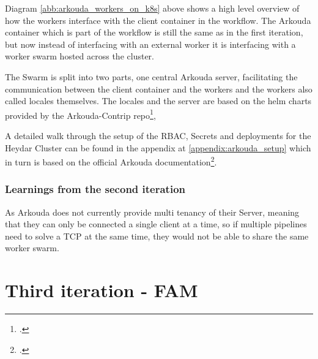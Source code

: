 Diagram \ref{abb:arkouda_workers_on_k8s} above shows a high level overview of how the workers interface with the client container in the workflow.
The Arkouda container which is part of the workflow is still the same as in the first iteration, but now instead of interfacing with an external worker it 
is interfacing with a worker swarm hosted across the cluster.

The Swarm is split into two parts, one central Arkouda server, facilitating the communication between the client container and the workers and the workers also called locales themselves.
The locales and the server are based on the helm charts provided by the Arkouda-Contrip repo\footcite{BearsRUsArkoudacontribArkoudahelmcharts},

A detailed walk through the setup of the \ac{RBAC}, Secrets and deployments for the Heydar Cluster can be found in the appendix at \ref{appendix:arkouda_setup} which in turn is based on the official
Arkouda documentation\footcite{ArkoudacontribArkoudadockerMain}.

\subsubsection*{Learnings from the second iteration}
As Arkouda does not currently provide multi tenancy of their Server, meaning that they can only be connected a single client at a time, 
so if multiple pipelines need to solve a \ac{TCP} at the same time, they would not be able to share the same worker swarm.





\section*{Third iteration - \ac{FAM}}

    







